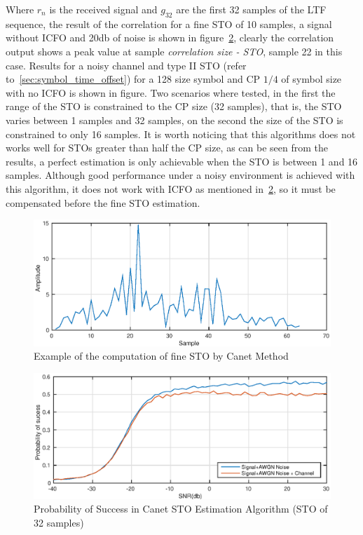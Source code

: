 Where $r_n$ is the received signal and $g_{32}$ are the first 32 samples of the LTF sequence, the result of the correlation for a fine STO of 10 samples, a signal without ICFO and 20db of noise is shown in figure~\ref{fig:xcorr_sfo_exm_canet}, clearly the correlation output shows a peak value at sample \emph{correlation size - STO}, sample 22 in this case. Results for a noisy channel and type II STO (refer to~\ref{sec:symbol_time_offset}) for a 128 size symbol and CP $1/4$ of symbol size with no ICFO is shown in figure. Two scenarios where tested, in the first the range of the STO is constrained to the CP size (32 samples), that is, the STO varies between 1 samples and 32 samples, on the second the size of the STO is constrained to only 16 samples. It is worth noticing that this algorithms does not works well for STOs greater than half the CP size, as can be seen from the results, a perfect estimation is only achievable when the STO is between 1 and 16 samples. Although good performance under a noisy environment is achieved with this algorithm, it does not work with ICFO as mentioned in~\ref{fig:xcorr_sfo_exm_canet}, so it must be compensated before the fine STO estimation. 




\begin{figure}[hbt]
  \centering
    \includegraphics[width=1\textwidth]
      {./figures/fine_sto_example_80211}
  \caption{Example of the computation of fine STO by Canet Method}
  \label{fig:xcorr_sfo_exm_canet}
\end{figure}


\begin{figure}[hbt]
  \centering
    \includegraphics[width=1\textwidth]
      {./figures/fine_sto_canet_32.eps}
  \caption{Probability of Success in Canet STO Estimation Algorithm (STO of 32 samples)}
  \label{fig:xcorr_sfo_exm_canet}
\end{figure}


